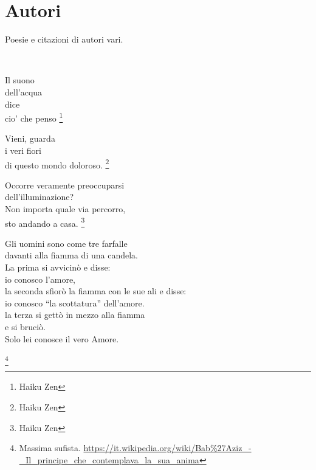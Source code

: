 \chapter{Autori}

Poesie e citazioni di autori vari.

\leavevmode\\[0.25in]

\vfill

\begin{haiku}
Il suono\\
dell'acqua\\
dice\\
cio' che penso \footnote{Haiku Zen}\\
\end{haiku}

\label{dolorosoMondo}
\begin{haiku}
Vieni, guarda\\
i veri fiori\\
di questo mondo doloroso.  \footnote{Haiku Zen}\\
\end{haiku}

\begin{haiku}
Occorre veramente preoccuparsi\\
dell'illuminazione?\\
Non importa quale via percorro,\\
sto andando a casa.  \footnote{Haiku Zen}\\
\end{haiku}

\begin{vcentered}
    \begin{poem}
Gli uomini sono come tre farfalle\\
davanti alla fiamma di una candela.\\
La prima si avvicinò e disse:\\
io conosco l'amore,\\
la seconda sfiorò la fiamma con le sue ali e disse:\\
io conosco ``la scottatura'' dell’amore.\\
la terza si gettò in mezzo alla fiamma\\
e si bruciò. \\
Solo lei conosce il vero Amore.\\
    \end{poem}
    \footnote{Massima sufista. \url{https://it.wikipedia.org/wiki/Bab\%27Aziz\_-\_Il\_principe\_che\_contemplava\_la\_sua\_anima}}
\end{vcentered}

